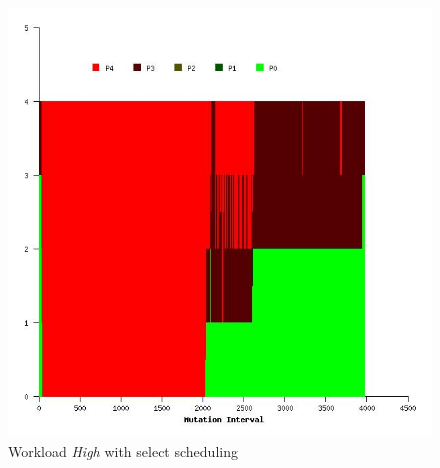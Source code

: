 \begin{figure}
  \begin{center}
    \includegraphics[scale=0.4]{figures/mutation_timeline_figures/mut_sel_t0/High/125_4.jpeg}%
    \caption{Workload \textit{High} with select scheduling}
    \label{fig:wrk_high_select}
  \end{center}
\end{figure}

